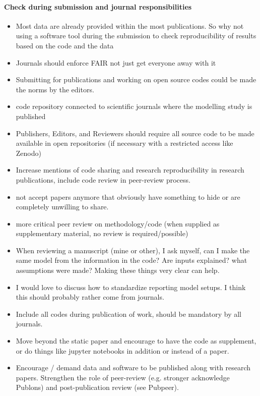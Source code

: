 \documentclass{article}
\begin{document}
\paragraph{Check during submission and journal responsibilities}
\begin{itemize}
	\item Most data are already provided within the most publications. So why not using a software tool during the submission to check reproducibility of results based on the code and the data
	\item Journals should enforce FAIR not just get everyone away with it
	\item Submitting for publications and working on open source codes could be made the norms by the editors.
	\item code repository connected to scientific journals where the modelling study is published
	\item Publishers, Editors, and Reviewers should require all source code to be made available in open repositories (if necessary with a restricted access like Zenodo)
	\item Increase mentions of code sharing and research reproducibility in research publications, include code review in peer-review process.
	\item not accept papers anymore that obviously have something to hide or are completely unwilling to share.
	\item more critical peer review on methodology/code (when supplied as supplementary material, no review is required/possible) 
	\item When reviewing a manuscript (mine or other), I ask myself, can I make the same model from the information in the code? Are inputs explained? what assumptions were made? Making these things very clear can help. 
	\item I would love to discuss how to standardize reporting model setups. I think this should probably rather come from journals.
	\item Include all codes during publication of work, should be mandatory by all journals.
	\item Move beyond the static paper and encourage to have the code as supplement, or do things like jupyter notebooks in addition or instead of a paper.
	\item Encourage / demand data and software to be published along with research papers. Strengthen the role of peer-review (e.g. stronger acknowledge Publons) and post-publication review (see Pubpeer).

\end{itemize}
\end{document}
